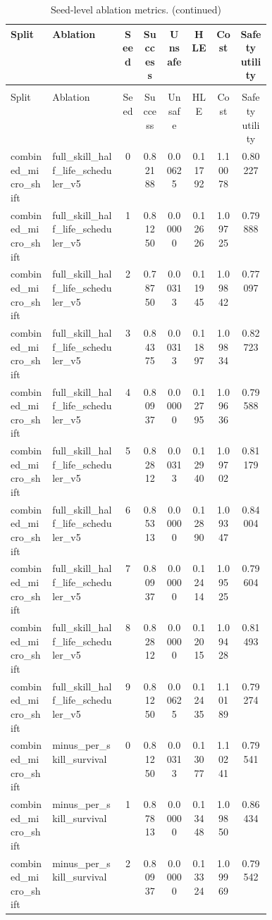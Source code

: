 \documentclass{article}
\begin{document}
\begin{center}
\scriptsize
\begin{longtable}{p{0.16\linewidth}p{0.27\linewidth}cccccc}
\caption{Seed-level ablation metrics.}\label{tab:ablation-seeds}\\
\toprule
Split & Ablation & Seed & Success & Unsafe & HLE & Cost & Safety utility\\
\midrule
\endfirsthead
\caption[]{Seed-level ablation metrics. (continued)}\\
\toprule
Split & Ablation & Seed & Success & Unsafe & HLE & Cost & Safety utility\\
\midrule
\endhead
combined\_micro\_shift & full\_skill\_half\_life\_scheduler\_v5 & 0 & 0.82188 & 0.00625 & 0.11792 & 1.10078 & 0.80227\\
combined\_micro\_shift & full\_skill\_half\_life\_scheduler\_v5 & 1 & 0.81250 & 0.00000 & 0.12626 & 1.09725 & 0.79888\\
combined\_micro\_shift & full\_skill\_half\_life\_scheduler\_v5 & 2 & 0.78750 & 0.00313 & 0.11945 & 1.09842 & 0.77097\\
combined\_micro\_shift & full\_skill\_half\_life\_scheduler\_v5 & 3 & 0.84375 & 0.00313 & 0.11897 & 1.09834 & 0.82723\\
combined\_micro\_shift & full\_skill\_half\_life\_scheduler\_v5 & 4 & 0.80937 & 0.00000 & 0.12795 & 1.09636 & 0.79588\\
combined\_micro\_shift & full\_skill\_half\_life\_scheduler\_v5 & 5 & 0.82812 & 0.00313 & 0.12940 & 1.09702 & 0.81179\\
combined\_micro\_shift & full\_skill\_half\_life\_scheduler\_v5 & 6 & 0.85313 & 0.00000 & 0.12890 & 1.09347 & 0.84004\\
combined\_micro\_shift & full\_skill\_half\_life\_scheduler\_v5 & 7 & 0.80937 & 0.00000 & 0.12414 & 1.09525 & 0.79604\\
combined\_micro\_shift & full\_skill\_half\_life\_scheduler\_v5 & 8 & 0.82812 & 0.00000 & 0.12015 & 1.09428 & 0.81493\\
combined\_micro\_shift & full\_skill\_half\_life\_scheduler\_v5 & 9 & 0.81250 & 0.00625 & 0.12435 & 1.10189 & 0.79274\\
combined\_micro\_shift & minus\_per\_skill\_survival & 0 & 0.81250 & 0.00313 & 0.13077 & 1.10241 & 0.79541\\
combined\_micro\_shift & minus\_per\_skill\_survival & 1 & 0.87813 & 0.00000 & 0.13448 & 1.09850 & 0.86434\\
combined\_micro\_shift & minus\_per\_skill\_survival & 2 & 0.80937 & 0.00000 & 0.13324 & 1.09969 & 0.79542\\

\end{longtable}
\end{center}
\end{document}
